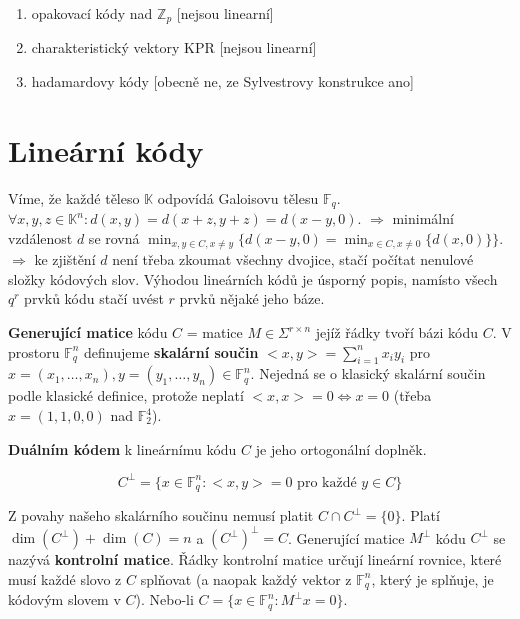 \begin{prikl}
	\begin{enumerate}
		\item opakovací kódy nad $\mathbb{Z}_p$ [nejsou linearní]
		\item charakteristický vektory KPR [nejsou linearní]
		\item hadamardovy kódy [obecně ne, ze Sylvestrovy konstrukce ano]
	\end{enumerate}
\end{prikl}

\section{Lineární kódy}

Víme, že každé těleso $\mathbb{K}$ odpovídá Galoisovu tělesu $\mathbb{F}_{q}$. $\forall x,y,z \in \mathbb{K}^{n}: d(x,y) = d(x+z, y+z) = d(x-y,0)$. $\Rightarrow$ minimální vzdálenost $d$ se rovná $\min_{x,y \in C, x \neq y} \{ d(x-y,0) = \min_{x \in C, x \neq 0} \{ d(x,0) \} \}$. $\Rightarrow$ ke zjištění $d$ není třeba zkoumat všechny dvojice, stačí počítat nenulové složky kódových slov. Výhodou lineárních kódů je úsporný popis, namísto všech $q^{r}$ prvků kódu stačí uvést $r$ prvků nějaké jeho báze.

\begin{definice}
	\textbf{Generující matice} kódu $C$ = matice $M \in \Sigma^{r \times n}$ jejíž řádky tvoří bázi kódu $C$. V prostoru $\mathbb{F}_{q}^{n}$ definujeme \textbf{skalární součin} $<x,y> = \sum_{i=1}^{n}x_{i}y_{i}$ pro $x = (x_{1}, \dots , x_{n}), y = (y_{1}, \dots , y_{n}) \in \mathbb{F}_{q}^{n}$. Nejedná se o klasický skalární součin podle klasické definice, protože neplatí $<x,x> = 0 \Leftrightarrow x=0$ (třeba $x = (1,1,0,0)$ nad $\mathbb{F}_{2}^{4}$).
\end{definice}

\begin{definice}
	\textbf{Duálním kódem} k lineárnímu kódu $C$ je jeho ortogonální doplněk.
	
	$$
	C^{\bot} = \{ x \in \mathbb{F}_{q}^{n}: <x,y> = 0 \text{ pro každé } y \in C \}
	$$
\end{definice}



Z povahy našeho skalárního součinu nemusí platit $C \cap C^{\bot} = \{ 0 \}$. Platí $\dim(C^{\bot}) + \dim(C) = n$ a $(C^{\bot})^{\bot} = C$. Generující matice $M^{\bot}$ kódu $C^{\bot}$ se nazývá \textbf{kontrolní matice}. Řádky kontrolní matice určují lineární rovnice, které musí každé slovo z $C$ splňovat (a naopak každý vektor z $\mathbb{F}_{q}^{n}$, který je splňuje, je kódovým slovem v $C$). Nebo-li $C = \{ x \in \mathbb{F}_{q}^{n}: M^{\bot}x = 0 \}$.

